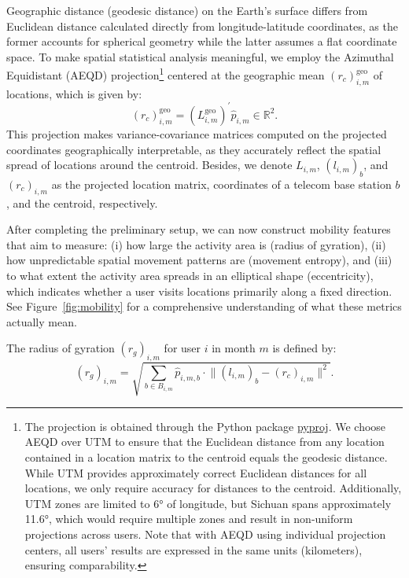 Geographic distance (geodesic distance) on the Earth's surface differs from Euclidean distance calculated directly from longitude-latitude coordinates, as the former accounts for spherical geometry while the latter assumes a flat coordinate space.
To make spatial statistical analysis meaningful, we employ the Azimuthal Equidistant (AEQD) projection\footnote{The projection is obtained through the Python package \href{https://github.com/pyproj4/pyproj}{pyproj}. We choose AEQD over UTM to ensure that the Euclidean distance from any location contained in a location matrix to the centroid equals the geodesic distance. While UTM provides approximately correct Euclidean distances for all locations, we only require accuracy for distances to the centroid. Additionally, UTM zones are limited to 6° of longitude, but Sichuan spans approximately 11.6°, which would require multiple zones and result in non-uniform projections across users. Note that with AEQD using individual projection centers, all users' results are expressed in the same units (kilometers), ensuring comparability.} centered at the geographic mean $(r_c)^{\text{geo}}_{i, m}$ of locations, which is given by:
\begin{equation}
(r_c)^{\text{geo}}_{i, m}
=
(L^{\text{geo}}_{i, m})^{'} \hat{p}_{i, m}
\in \mathbb{R}^2.
\end{equation}
This projection makes variance-covariance matrices computed on the projected coordinates geographically interpretable, as they accurately reflect the spatial spread of locations around the centroid. Besides, we denote $L_{i, m}$, $(l_{i, m})_b$, and $(r_c)_{i, m}$ as the projected location matrix, coordinates of a telecom base station $b$, and the centroid, respectively.

After completing the preliminary setup, we can now construct mobility features that aim to measure: (i) how large the activity area is (radius of gyration), (ii) how unpredictable spatial movement patterns are (movement entropy), and (iii) to what extent the activity area spreads in an elliptical shape (eccentricity), which indicates whether a user visits locations primarily along a fixed direction.
See Figure~\ref{fig:mobility} for a comprehensive understanding of what these metrics actually mean.


\begin{definition}
The radius of gyration $(r_g)_{i, m}$ for user $i$ in month $m$ is defined by:
\[
(r_g)_{i, m}
=
\sqrt{
    \sum_{ b \in B_{i, m}}
    \hat{p}_{i, m, b} \cdot \lVert (l_{i, m})_b - (r_c)_{i, m} \rVert^2
}.
\]
\end{definition}



